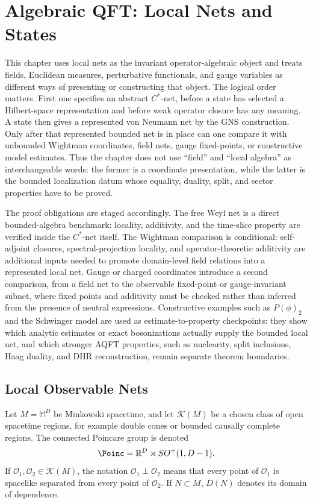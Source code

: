 \chapter{Algebraic QFT: Local Nets and States}
\label{ch:volume-iv-aqft-local-nets-states}
\ConventionsLorentzian

This chapter uses local nets as the invariant operator-algebraic object and
treats fields, Euclidean measures, perturbative functionals, and gauge
variables as different ways of presenting or constructing that object.  The
logical order matters.  First one specifies an abstract \(C^*\)-net, before a
state has selected a Hilbert-space representation and before weak operator
closure has any meaning.  A state then gives a represented von Neumann net by
the GNS construction.  Only after that represented bounded net is in place can
one compare it with unbounded Wightman coordinates, field nets, gauge
fixed-points, or constructive model estimates.  Thus the chapter does not use
``field'' and ``local algebra'' as interchangeable words: the former is a
coordinate presentation, while the latter is the bounded localization datum
whose equality, duality, split, and sector properties have to be proved.

The proof obligations are staged accordingly.  The free Weyl net is a direct
bounded-algebra benchmark: locality, additivity, and the time-slice property
are verified inside the \(C^*\)-net itself.  The Wightman comparison is
conditional: self-adjoint closures, spectral-projection locality, and
operator-theoretic additivity are additional inputs needed to promote
domain-level field relations into a represented local net.  Gauge or charged
coordinates introduce a second comparison, from a field net to the observable
fixed-point or gauge-invariant subnet, where fixed points and additivity must
be checked rather than inferred from the presence of neutral expressions.
Constructive examples such as \(P(\phi)_2\) and the Schwinger model are used
as estimate-to-property checkpoints: they show which analytic estimates or
exact bosonizations actually supply the bounded local net, and which stronger
AQFT properties, such as nuclearity, split inclusions, Haag duality, and DHR
reconstruction, remain separate theorem boundaries.


\section{Local Observable Nets}

Let \(M=\mathbb M^D\) be Minkowski spacetime, and let
\(\mathcal K(M)\) be a chosen class of open spacetime regions, for example
double cones or bounded causally complete regions.  The connected Poincare
group is denoted
\[
  \Poinc=\mathbb R^D\rtimes SO^+(1,D-1).
\]
If \(\mathcal O_1,\mathcal O_2\in\mathcal K(M)\), the notation
\(\mathcal O_1\perp\mathcal O_2\) means that every point of
\(\mathcal O_1\) is spacelike separated from every point of
\(\mathcal O_2\).  If \(N\subset M\), \(D(N)\) denotes its domain of
dependence.

